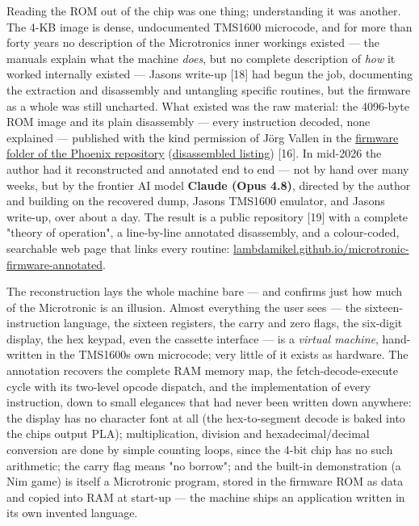 \documentclass[
  11pt,
  letterpaper,
]{article}
\newcounter{none} %
\begin{document}
Reading the ROM out of the chip was one thing; understanding it was
another. The 4-KB image is dense, undocumented TMS1600 microcode, and
for more than forty years no description of the
Microtronic\textquotesingle s inner workings existed --- the manuals
explain what the machine \emph{does}, but no complete description of
\emph{how} it worked internally existed --- Jason\textquotesingle s
write-up {[}18{]} had begun the job, documenting the extraction and
disassembly and untangling specific routines, but the firmware as a
whole was still uncharted. What existed was the raw material: the
4096-byte ROM image and its plain disassembly --- every instruction
decoded, none explained --- published with the kind permission of Jörg
Vallen in the
\href{https://github.com/lambdamikel/microtronic-phoenix/tree/main/microtronic-firmware}{firmware
folder of the Phoenix repository}
(\href{https://github.com/lambdamikel/microtronic-phoenix/blob/main/microtronic-firmware/microtronic-firmware-disassembled.txt}{disassembled
listing}) {[}16{]}. In mid-2026 the author had it reconstructed and
annotated end to end --- not by hand over many weeks, but by the
frontier AI model \textbf{Claude (Opus 4.8)}, directed by the author and
building on the recovered dump, Jason\textquotesingle s TMS1600
emulator, and Jason\textquotesingle s write-up, over about a day. The
result is a public repository {[}19{]} with a complete "theory of
operation", a line-by-line annotated disassembly, and a colour-coded,
searchable web page that links every routine:
\href{https://lambdamikel.github.io/microtronic-firmware-annotated/}{lambdamikel.github.io/microtronic-firmware-annotated}.

The reconstruction lays the whole machine bare --- and confirms just how
much of the Microtronic is an illusion. Almost everything the user sees
--- the sixteen-instruction language, the sixteen registers, the carry
and zero flags, the six-digit display, the hex keypad, even the cassette
interface --- is a \emph{virtual machine}, hand-written in the
TMS1600\textquotesingle s own microcode; very little of it exists as
hardware. The annotation recovers the complete RAM memory map, the
fetch-decode-execute cycle with its two-level opcode dispatch, and the
implementation of every instruction, down to small elegances that had
never been written down anywhere: the display has no character font at
all (the hex-to-segment decode is baked into the chip\textquotesingle s
output PLA); multiplication, division and hexadecimal/decimal conversion
are done by simple counting loops, since the 4-bit chip has no such
arithmetic; the carry flag means "no borrow"; and the built-in
demonstration (a Nim game) is itself a Microtronic program, stored in
the firmware ROM as data and copied into RAM at start-up --- the machine
ships an application written in its own invented language.
\end{document}
